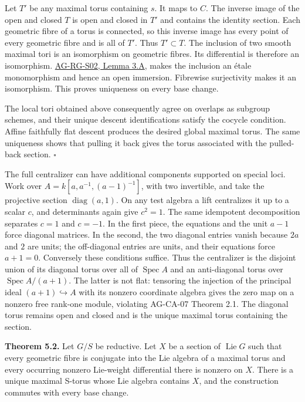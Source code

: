 \documentclass[11pt,a4paper,openany]{report}
\begin{document}
Let \(T'\) be any maximal torus containing \(s\). It maps to \(C\). The inverse image of the open and closed \(T\) is open and closed in \(T'\) and contains the identity section. Each geometric fibre of a torus is connected, so this inverse image has every point of every geometric fibre and is all of \(T'\). Thus \(T'\subset T\). The inclusion of two smooth maximal tori is an isomorphism on geometric fibres. Its differential is therefore an isomorphism. \href{AG-RG-S02.html\#smooth-map-differential}{AG-RG-S02, Lemma 3.A}, makes the inclusion an étale monomorphism and hence an open immersion. Fibrewise surjectivity makes it an isomorphism. This proves uniqueness on every base change.

The local tori obtained above consequently agree on overlaps as subgroup schemes, and their unique descent identifications satisfy the cocycle condition. Affine faithfully flat descent produces the desired global maximal torus. The same uniqueness shows that pulling it back gives the torus associated with the pulled-back section. \(\square\)

The full centralizer can have additional components supported on special loci. Work over \(A=k[a,a^{-1},(a-1)^{-1}]\), with two invertible, and take the projective section \(\operatorname{diag}(a,1)\). On any test algebra a lift centralizes it up to a scalar \(c\), and determinants again give \(c^2=1\). The same idempotent decomposition separates \(c=1\) and \(c=-1\). In the first piece, the equations and the unit \(a-1\) force diagonal matrices. In the second, the two diagonal entries vanish because \(2a\) and \(2\) are units; the off-diagonal entries are units, and their equations force \(a+1=0\). Conversely these conditions suffice. Thus the centralizer is the disjoint union of its diagonal torus over all of \(\operatorname{Spec}A\) and an anti-diagonal torus over \(\operatorname{Spec}A/(a+1)\). The latter is not flat: tensoring the injection of the principal ideal \((a+1)\hookrightarrow A\) with its nonzero coordinate algebra gives the zero map on a nonzero free rank-one module, violating AG-CA-07 Theorem 2.1. The diagonal torus remains open and closed and is the unique maximal torus containing the section.

\textbf{Theorem 5.2.} Let \(G/S\) be reductive. Let \(X\) be a section of \(\operatorname{Lie}G\) such that every geometric fibre is conjugate into the Lie algebra of a maximal torus and every occurring nonzero Lie-weight differential there is nonzero on \(X\). There is a unique maximal S-torus whose Lie algebra contains \(X\), and the construction commutes with every base change.
\end{document}
